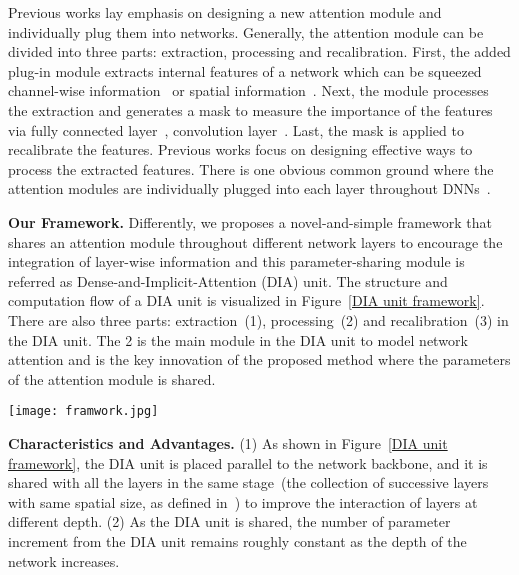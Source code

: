 \documentclass[letterpaper]{article} \usepackage{aaai20}  \usepackage{times}  \usepackage{helvet} \usepackage{courier}  \usepackage[hyphens]{url}  \usepackage{graphicx} \urlstyle{rm} \def\UrlFont{\rm}  \usepackage{graphicx}  \frenchspacing  \setlength{\pdfpagewidth}{8.5in}  \setlength{\pdfpageheight}{11in}  \usepackage{color}
\begin{document}
	Previous works lay emphasis on designing a new attention module and individually plug them into networks. Generally, the attention module can be divided into three parts: extraction, processing and recalibration. First, the added plug-in module extracts internal features of a network which can be squeezed channel-wise information~\cite{hu2018squeeze,li2019selective} or spatial information~\cite{wang2018non,woo2018cbam,park2018bam}. Next, the module processes the extraction and generates a mask to measure the importance of the features via fully connected layer~\cite{hu2018squeeze}, convolution layer~\cite{wang2018non}. Last, the mask is applied to recalibrate the features. Previous works focus on designing effective ways to process the extracted features. There is one obvious common ground where the attention modules are individually plugged into each layer throughout DNNs~\cite{hu2018squeeze,woo2018cbam,park2018bam,wang2018non}.
	
\textbf{Our Framework.} Differently, we proposes a novel-and-simple framework that shares an attention module throughout different network layers to encourage the integration of layer-wise information and this parameter-sharing module is referred as Dense-and-Implicit-Attention (DIA) unit. The structure and computation flow of a DIA unit is visualized in Figure~\ref{DIA unit framework}. There are also three parts: extraction~({\small{\textcircled{\tiny{1}}}}), processing~({\small{\textcircled{\tiny{2}}}}) and recalibration~({\small{\textcircled{\tiny{3}}}}) in the DIA unit. The {\small{\textcircled{\tiny{2}}}} is the main module in the DIA unit to model network attention and is the key innovation of the proposed method where the parameters of the attention module is shared. 
\begin{figure*}[h]
		\centering
		\texttt{[image: framwork.jpg]}
		\caption{DIA units. $F_{ext}$ means the operation for extracting different scales of features. $F_{emp}$ means the operation for emphasizing features.}
		\label{DIA unit framework}
	\end{figure*}
\textbf{Characteristics and Advantages.} (1) As shown in Figure~\ref{DIA unit framework}, the DIA unit is placed parallel to the network backbone, and it is shared with all the layers in the same stage~(the collection of successive layers with same spatial size, as defined in~\cite{he2016deep}) to improve the interaction of layers at different depth. (2) As the DIA unit is shared, the number of parameter increment from the DIA unit remains roughly constant as the depth of the network increases.
\end{document}
